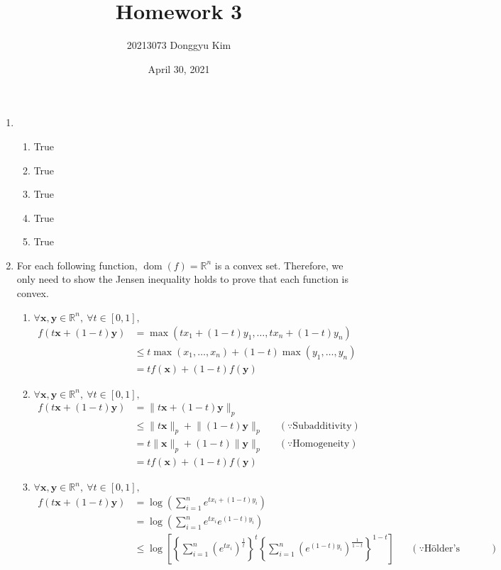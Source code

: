 \documentclass[11pt]{article}
\title{Homework 3}
\author{20213073 Donggyu Kim}
\date{April 30, 2021}
\newcommand{\norm}[2][]{\lVert#2\rVert_{#1}}
\begin{document}
\maketitle
\thispagestyle{fancy}

\begin{enumerate}
\item
\begin{enumerate}
    \item True
    \item True
    \item True
    \item True
    \item True
\end{enumerate}
\item
For each following function, $\operatorname{dom}(f)=\mathbb{R}^{n}$ is a convex set. Therefore, we only need to show the Jensen inequality holds to prove that each function is convex.
\begin{enumerate}
    \item
    $\forall \bm x,\bm y\in\mathbb{R}^{n},\ \forall t\in [0,1],$
    \begin{align*}
    f(t\bm x+(1-t)\bm y) &= \max(tx_{1}+(1-t)y_{1},\dots,tx_{n}+(1-t)y_{n}) \\
    &\le t\max(x_{1},\dots,x_{n})+(1-t)\max(y_{1},\dots,y_{n}) \\
    &= tf(\bm x)+(1-t)f(\bm y)
    \end{align*}
    \item
    $\forall \bm x,\bm y\in\mathbb{R}^{n},\ \forall t\in [0,1],$
    \begin{align*}
    f(t\bm x+(1-t)\bm y) &= \norm[p]{t\bm x+(1-t)\bm y} \\
    &\le \norm[p]{t\bm x}+\norm[p]{(1-t)\bm y}
    && (\because \text{Subadditivity}) \\
    &= t\norm[p]{\bm x}+(1-t)\norm[p]{\bm y}
    && (\because \text{Homogeneity}) \\
    &= tf(\bm x)+(1-t)f(\bm y)
    \end{align*}
    \item
    $\forall \bm x,\bm y\in\mathbb{R}^{n},\ \forall t\in [0,1],$
    \begin{align*}
    f(t\bm x+(1-t)\bm y)
    &= \log\left(\sum_{i=1}^{n}e^{tx_{i}+(1-t)y_{i}}\right) \\
    &= \log\left(\sum_{i=1}^{n}e^{tx_{i}}e^{(1-t)y_{i}}\right) \\
    &\le \log\left[\left\{\sum_{i=1}^{n}\left(e^{tx_{i}}\right)^{\frac{1}{t}}\right\}^{t}\left\{\sum_{i=1}^{n}\left(e^{(1-t)y_{i}}\right)^{\frac{1}{1-t}}\right\}^{1-t}\right] && (\because \text{H\"older's inequality}) \\

\end{align*}
\end{enumerate}
\end{enumerate}
\end{document}
